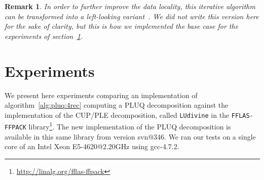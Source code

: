 \documentclass{article}
\newtheorem{remark}{Remark}
\begin{document}
\begin{remark}
In order to further improve the data locality, this iterative
algorithm can be transformed into a left-looking
variant~\cite{DonDufSorVor98}. We did not write this version here for
the sake of clarity, but this is how we implemented the base case for
the experiments of section~\ref{sec:exp}.
\end{remark}
 \section{Experiments}\label{sec:exp}
We present here experiments comparing an implementation of
algorithm~\ref{alg:pluq:4rec} computing a PLUQ decomposition against the
implementation of the CUP/PLE decomposition, called \texttt{LUdivine} in the 
\texttt{FFLAS-FFPACK} library\footnote{\url{http://linalg.org/fflas-ffpack}}.
The new implementation of the PLUQ
decomposition is available in this same library from version svn@346.
We ran our tests on a single core of an Intel Xeon
E5-4620@2.20GHz using gcc-4.7.2.
\end{document}

